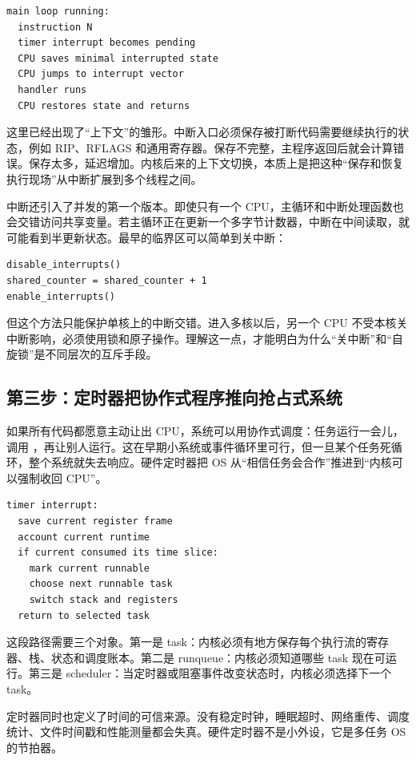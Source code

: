 \begin{lstlisting}
main loop running:
  instruction N
  timer interrupt becomes pending
  CPU saves minimal interrupted state
  CPU jumps to interrupt vector
  handler runs
  CPU restores state and returns
\end{lstlisting}

这里已经出现了“上下文”的雏形。中断入口必须保存被打断代码需要继续执行的状态，例如 RIP、RFLAGS 和通用寄存器。保存不完整，主程序返回后就会计算错误。保存太多，延迟增加。内核后来的上下文切换，本质上是把这种“保存和恢复执行现场”从中断扩展到多个线程之间。

中断还引入了并发的第一个版本。即使只有一个 CPU，主循环和中断处理函数也会交错访问共享变量。若主循环正在更新一个多字节计数器，中断在中间读取，就可能看到半更新状态。最早的临界区可以简单到关中断：

\begin{lstlisting}
disable_interrupts()
shared_counter = shared_counter + 1
enable_interrupts()
\end{lstlisting}

但这个方法只能保护单核上的中断交错。进入多核以后，另一个 CPU 不受本核关中断影响，必须使用锁和原子操作。理解这一点，才能明白为什么“关中断”和“自旋锁”是不同层次的互斥手段。

\subsection{第三步：定时器把协作式程序推向抢占式系统}

如果所有代码都愿意主动让出 CPU，系统可以用协作式调度：任务运行一会儿，调用 ，再让别人运行。这在早期小系统或事件循环里可行，但一旦某个任务死循环，整个系统就失去响应。硬件定时器把 OS 从“相信任务会合作”推进到“内核可以强制收回 CPU”。

\begin{lstlisting}
timer interrupt:
  save current register frame
  account current runtime
  if current consumed its time slice:
    mark current runnable
    choose next runnable task
    switch stack and registers
  return to selected task
\end{lstlisting}

这段路径需要三个对象。第一是 task：内核必须有地方保存每个执行流的寄存器、栈、状态和调度账本。第二是 runqueue：内核必须知道哪些 task 现在可运行。第三是 scheduler：当定时器或阻塞事件改变状态时，内核必须选择下一个 task。

定时器同时也定义了时间的可信来源。没有稳定时钟，睡眠超时、网络重传、调度统计、文件时间戳和性能测量都会失真。硬件定时器不是小外设，它是多任务 OS 的节拍器。

